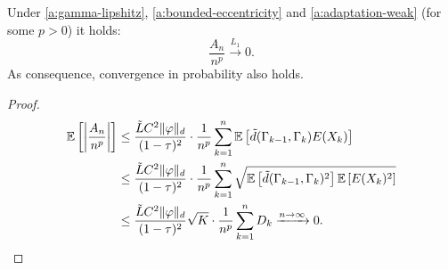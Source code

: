 \begin{lemma}
Under \ref{a:gamma-lipshitz}, \ref{a:bounded-eccentricity} and \ref{a:adaptation-weak} (for some $p>0$) it holds:
\[
    \frac{A_n}{n^p} \xrightarrow{L_1} 0.
\]
As consequence, convergence in probability also holds.
\begin{proof}
    \begin{align*}
    \mathbb{E} \left[ \left\vert\frac{A_n}{n^p}\right\vert \right] &\leq \frac{\tilde{L} C^2 \| \varphi \|_d}{(1-\tau)^2} \cdot \frac{1}{n^p}  \sum_{k=1}^n \mathbb{E} \left[ \tilde{d}(\Gamma_{k-1}, \Gamma_k) E(X_k) \right] \\
    &\leq \frac{\tilde{L} C^2 \| \varphi \|_d}{(1-\tau)^2} \cdot \frac{1}{n^p}  \sum_{k=1}^n \sqrt{\mathbb{E} \left[ \tilde{d}(\Gamma_{k-1}, \Gamma_k)^2 \right] \mathbb{E} \left[ E(X_k)^2 \right]} \\
    &\leq \frac{\tilde{L} C^2 \| \varphi \|_d}{(1-\tau)^2}\sqrt{K} \cdot \frac{1}{n^p} \sum_{k=1}^n D_k \xrightarrow{n \to \infty} 0.
\end{align*}
\end{proof}
\end{lemma}

